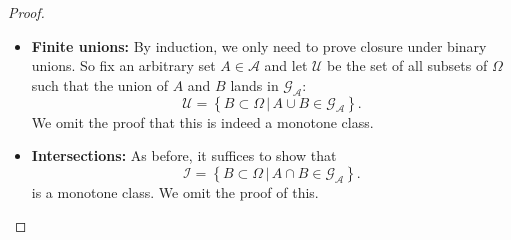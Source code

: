 \documentclass[a4paper,12pt]{scrreprt}
\newcommand{\N}{\mathbb{N}}
\theoremstyle{definition}
\theoremstyle{plain}
\theoremstyle{remark}
\begin{document}
\begin{proof}
\begin{itemize}
\begin{itemize}
          In this case, we have $A_{1}^{c} \supseteq A_{2}^{c} \supseteq \cdots$, and
          \begin{equation*}
            \bigcup_{i \in \N} A_{i} = {\left( \bigcap_{i \in \N} A_{i}^{c} \right)}^{c}.
          \end{equation*}
          All the $A_{i}^{c}$ are in $\mathcal{G}_{\mathcal{A}}$ by definition of $\mathcal{C}$, and their countable monotone intersection is in $\mathcal{G}_{\mathcal{A}}$ since $\mathcal{G}_{\mathcal{A}}$ is a monotone class. Since $\mathcal{C}$ is the set of all sets whose complements are in $\mathcal{G}_{\mathcal{A}}$ and $\bigcap_{i \in \N} A_{i}^{c}$ is in $\mathcal{G}_{A}$, its complement $\bigcup_{i \in \N} A_{i}$ is in $\mathcal{G}_{\mathcal{A}}$.

        \item If $A_{1} \supseteq A_{2} \supseteq \cdots$, then
          \begin{equation*}
            \bigcap_{i \in \N} A_{i} \in \mathcal{C}.
          \end{equation*}
          The proof is identical, but with inclusions reversed.
      \end{itemize}

      We give only sketches of the proofs of the other two conditions, as they are similar to the first case.

    \item \textbf{Finite unions:} By induction, we only need to prove closure under binary unions. So fix an arbitrary set $A \in \mathcal{A}$ and let $\mathcal{U}$ be the set of all subsets of $\Omega$ such that the union of $A$ and $B$ lands in $\mathcal{G}_{\mathcal{A}}$:
      \begin{equation*}
        \mathcal{U} = \left\{ B \subset \Omega\,\big|\, A \cup B \in \mathcal{G}_{\mathcal{A}} \right\}.
      \end{equation*}
      We omit the proof that this is indeed a monotone class.

    \item \textbf{Intersections:} As before, it suffices to show that
      \begin{equation*}
        \mathcal{I} = \left\{ B \subset \Omega\,\big|\, A \cap B \in \mathcal{G}_{\mathcal{A}} \right\}.
      \end{equation*}
      is a monotone class. We omit the proof of this.
  \end{itemize}
\end{proof}
\end{document}

